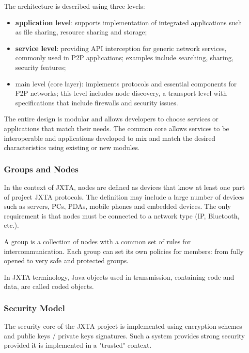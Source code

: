 The architecture is described using three levels:

\begin{itemize}
  \item \textbf{application level}: supports implementation of integrated
  applications such as file sharing, resource sharing and storage;
  \item \textbf{service level}: providing API interception for generic network
  services, commonly used in P2P applications; examples include searching,
  sharing, security features;
  \item main level (core layer): implements protocols and essential components
  for P2P networks; this level includes node discovery, a transport level with
  specifications that include firewalls and security issues.
\end{itemize}

The entire design is modular and allows developers to choose services or
applications that match their needs. The common core allows services to be
interoperable and applications developed to mix and match the desired
characteristics using existing or new modules.

\subsubsection{Groups and Nodes}

In the context of JXTA, nodes are defined as devices that know at least one
part of project JXTA protocols. The definition may include a large number of
devices such as servers, PCs, PDAs, mobile phones and embedded devices. The
only requirement is that nodes must be connected to a network type (IP,
Bluetooth, etc.).

A group is a collection of nodes with a common set of rules for
intercommunication. Each group can set its own policies for members: from
fully opened to very safe and protected groups.

In JXTA terminology, Java objects used in transmission, containing code and
data, are called coded objects.

\subsubsection{Security Model}

The security core of the JXTA project is implemented using encryption schemes
and public keys / private keys signatures. Such a system provides strong
security provided it is implemented in a "trusted" context.

